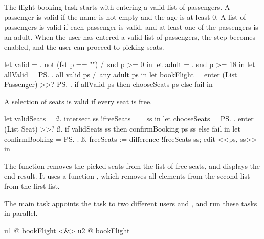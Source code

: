 The flight booking task starts with entering a valid list of passengers.
A passenger is valid if the name is not empty and the age is at least 0.
A list of passengers is valid if each passenger is valid, and at least one of the passengers is an adult.
When the user has entered a valid list of passengers, the step becomes enabled, and the user can proceed to picking seats.
\begin{TASK}
  let valid = \p. not (fst p == "") /\ snd p >= 0 in
  let adult = \p. snd p >= 18 in
  let allValid = \ps. all valid ps /\ any adult ps in
  let bookFlight = enter (List Passenger) >>? \ps.
    if allValid ps then chooseSeats ps else fail in
\end{TASK}
A selection of seats is valid if every seat is free.
\begin{TASK}
  let validSeats = \ss. intersect ss !freeSeats == ss in
  let chooseSeats = \ps. enter (List Seat) >>? \ss.
    if validSeats ss then confirmBooking ps ss else fail in
  let confirmBooking = \ps. \ss.
      freeSeats := difference !freeSeats ss;
      edit <<ps, ss>> in
\end{TASK}
The function  removes the picked seats from the list of free seats, and displays the end result.
It uses a function , which removes all elements from the second list from the first list.

The main task appoints the  task to two different users  and ,
and run these tasks in parallel.
\begin{TASK}
  u1 @ bookFlight <&> u2 @ bookFlight
\end{TASK}
